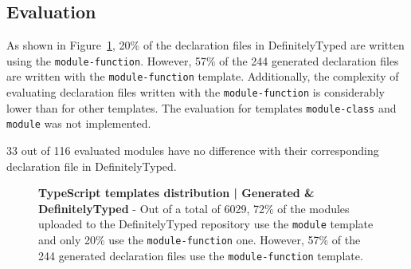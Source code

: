 \documentclass[a4paper,english,cleveref, autoref]{lipics-v2019}
\newcommand{\figref}[1]{Figure~\ref{#1}}
\begin{document}
\subsection{Evaluation}
As shown in \figref{fig:experiments-typescript-templates-distribution-definitely-typed}, 20\% of the declaration files in DefinitelyTyped are written using the \lstinline{module-function}. However, 57\% of the 244 generated declaration files are written with the \lstinline{module-function} template. Additionally, the complexity of evaluating declaration files written with the \lstinline{module-function} is considerably lower than for other templates. The evaluation for templates \lstinline{module-class} and \lstinline{module} was not implemented.

33 out of 116 evaluated modules have no difference with their corresponding declaration file in DefinitelyTyped.

\begin{figure}[tp]
	\centering

	\caption[TypeScript templates distribution | Generated \& DefinitelyTyped]{\textbf{TypeScript templates distribution | Generated \& DefinitelyTyped} - Out of a total of 6029, 72\% of the modules uploaded to the DefinitelyTyped repository use the \lstinline{module} template and only 20\% use the \lstinline{module-function} one. However, 57\% of the 244 generated declaration files use the \lstinline{module-function} template.
	}

	\label{fig:experiments-typescript-templates-distribution-definitely-typed}
\end{figure}
\end{document}
